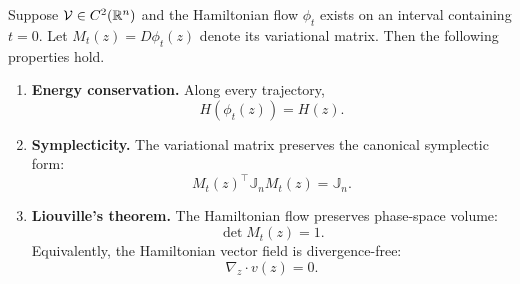 \documentclass[12pt,a4paper,oneside]{book}
\begin{document}
\begin{theorem}
\label{thm:hamiltonian-properties}
\label{src:p10all}

Suppose $\mathcal V\in C^2(\mathbb{R}^n)$ and the Hamiltonian flow $\phi_t$ exists on an interval containing $t=0$. Let $M_t(z)=D\phi_t(z)$
denote its variational matrix. Then the following properties hold.

\label{src:p10q2}
\begin{enumerate}
    \item \textbf{Energy conservation.}
        Along every trajectory,
        \begin{equation*}
            H(\phi_t(z))=H(z).
        \end{equation*}

    \label{src:p10q4}
    \item \textbf{Symplecticity.}
        The variational matrix preserves the canonical symplectic form:
        \begin{equation}
            M_t(z)^\top\mathbb J_n M_t(z)=\mathbb J_n.
            \label{eq:symplectic}
        \end{equation}

    \item \textbf{Liouville's theorem.}
        The Hamiltonian flow preserves phase-space volume:
        \begin{equation*}
            \det M_t(z)=1.
        \end{equation*}
        Equivalently, the Hamiltonian vector field is divergence-free:
        \begin{equation*}
            \nabla_z\cdot v(z)=0.
        \end{equation*}
\end{enumerate}
\end{theorem}
\end{document}
